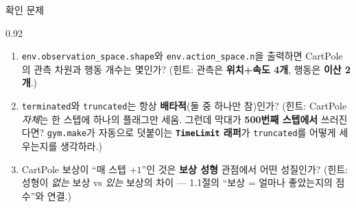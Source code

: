 \begin{frame}{확인 문제}
\begin{center}\begin{varwidth}{0.92\textwidth}
  \begin{enumerate}
    \item \texttt{env.observation\_space.shape}와
      \texttt{env.action\_space.n}을 출력하면 CartPole의 관측 차원과
      행동 개수는 몇인가? (힌트: 관측은 \textbf{위치+속도 4개},
      행동은 \textbf{이산 2개}.)
    \item \texttt{terminated}와 \texttt{truncated}는 항상
      \textbf{배타적}(둘 중 하나만 참)인가?
      (힌트: CartPole \textit{자체}는 한 스텝에 하나의 플래그만 세움.
      그런데 막대가 \textbf{500번째 스텝에서} 쓰러진다면?
      \texttt{gym.make}가 자동으로 덧붙이는 \textbf{\texttt{TimeLimit}
      래퍼}가 \texttt{truncated}를 어떻게 세우는지를 생각하라.)
    \item CartPole 보상이 ``매 스텝 $+1$''인 것은 \textbf{보상 성형}
      관점에서 어떤 성질인가? (힌트: 성형이 \textit{없는} 보상 vs
      \textit{있는} 보상의 차이 --- 1.1절의 ``보상 = 얼마나 좋았는지의
      점수''와 연결.)
  \end{enumerate}
\end{varwidth}\end{center}
\end{frame}
